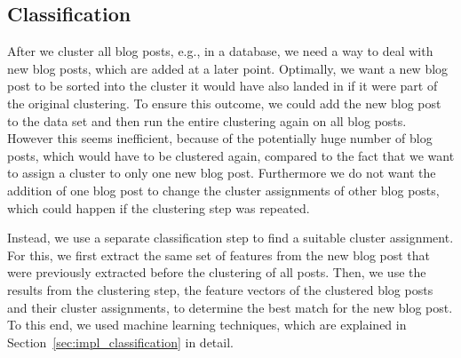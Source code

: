 
\subsection{Classification}
\label{sec:classification}



After we cluster all blog posts, e.g., in a database, we need a way to deal with new blog posts, which are added at a later point.
Optimally, we want a new blog post to be sorted into the cluster it would have also landed in if it were part of the original clustering.
To ensure this outcome, we could add the new blog post to the data set and then run the entire clustering again on all blog posts.
However this seems inefficient, because of the potentially huge number of blog posts, which would have to be clustered again, compared to the fact that we want to assign a cluster to only one new blog post.
Furthermore we do not want the addition of one blog post to change the cluster assignments of other blog posts, which could happen if the clustering step was repeated.


Instead, we use a separate classification step to find a suitable cluster assignment.
For this, we first extract the same set of features from the new blog post that were previously extracted before the clustering of all posts.
Then, we use the results from the clustering step, the feature vectors of the clustered blog posts and their cluster assignments, to determine the best match for the new blog post.
To this end, we used machine learning techniques, which are explained in Section~\ref{sec:impl_classification} in detail.
